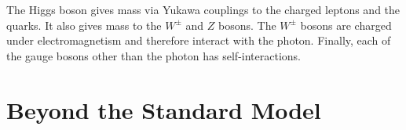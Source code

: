 The Higgs boson gives mass via Yukawa couplings to the charged leptons and the quarks.
It also gives mass to the $W^\pm$ and $Z$ bosons.
The $W^\pm$ bosons are charged under electromagnetism and therefore interact with the photon.
Finally, each of the gauge bosons other than the photon has self-interactions.

\section{Beyond the Standard Model}
\label{sec:SM:BSM}
